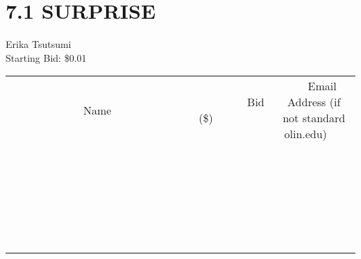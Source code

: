 \documentclass[11pt]{article}
\begin{document}
\section*{7.1 SURPRISE}
Erika Tsutsumi
\\
Starting Bid: \$0.01
\newline
\begin{tabular}{c c c}
~~~~~~~~~~~~~Name~~~~~~~~~~~~~ & ~~~~~~~~~Bid (\$)~~~~~~~~~  & ~~~Email Address (if not standard olin.edu)~~~\\
 & & \\
\hline
 & & \\
\hline
 & & \\
\hline
 & & \\
\hline
 & & \\
\hline
 & & \\
\hline
 & & \\
\hline
 & & \\
\hline
 & & \\
\hline
 & & \\
\hline
 & & \\
\hline
 & & \\
\hline
 & & \\
\hline
 & & \\
\hline
 & & \\
\hline
 & & \\
\hline
 & & \\
\hline
 & & \\
\hline
 & & \\
\hline
 & & \\
\hline
 & & \\
\hline
 & & \\
\hline
 & & \\
\hline
 & & \\
\hline
 & & \\
\hline
 & & \\
\hline
\end{tabular}
\newpage
\end{document}

